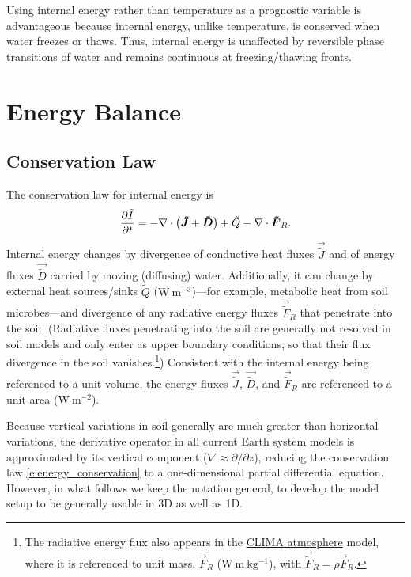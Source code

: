 \documentclass{report}
\begin{document}
Using internal energy rather than temperature as a prognostic variable is advantageous because internal energy, unlike temperature, is conserved when water freezes or thaws. Thus, internal energy is unaffected by reversible phase transitions of water and remains continuous at freezing/thawing fronts.

\section{Energy Balance}

\subsection{Conservation Law}

The conservation law for internal energy is
\begin{equation}\label{e:energy_conservation}
    \frac{\partial \tilde I}{\partial t} =  - \nabla \cdot \bigl(\boldsymbol{{\tilde J}} + \boldsymbol{{\tilde D}}\bigr) + \tilde Q - \nabla \cdot \boldsymbol{{\tilde F}}_R.
\end{equation}
Internal energy changes by divergence of conductive heat fluxes $\vec{\tilde J}$ and of energy fluxes $\vec{\tilde D}$ carried by moving (diffusing) water. Additionally, it can change by external heat sources/sinks $\tilde Q$ ($\mathrm{W~m^{-3}}$)---for example, metabolic heat from soil microbes---and divergence of any radiative energy fluxes $\vec{\tilde F}_R$ that penetrate into the soil. (Radiative fluxes penetrating into the soil are generally not resolved in soil models and only enter as upper boundary conditions, so that their flux divergence in the soil vanishes.\footnote{The radiative energy flux also appears in the \protect\href{https://github.com/climate-machine/Design-Docs/blob/master/CLIMA-atmos/}{CLIMA atmosphere} model, where it is referenced to unit mass, $\vec{F}_R$ ($\mathrm{W~m~kg^{-1}}$), with $\vec{\tilde F}_R = \rho \vec{F}_R$.}) Consistent with the internal energy being referenced to a unit volume, the energy fluxes $\vec{\tilde J}$, $\vec{\tilde D}$, and $\vec{\tilde F}_R$ are referenced to a unit area ($\mathrm{W~m^{-2}}$). 

Because vertical variations in soil generally are much greater than horizontal variations, the derivative operator in all current Earth system models is approximated by its vertical component ($\nabla \approx \partial/\partial z$), reducing the conservation law \eqref{e:energy_conservation} to a one-dimensional partial differential equation. However, in what follows we keep the notation general, to develop the model setup to be generally usable in 3D as well as 1D. 
\end{document}
